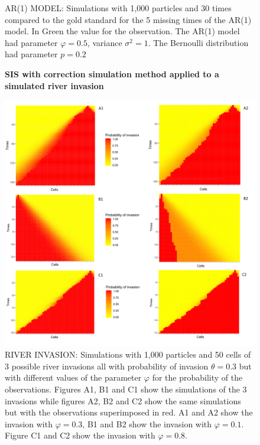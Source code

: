 \documentclass[11pt,a4paper]{article}
\begin{document}
\begin{figure} [h!]
    \caption{AR(1) MODEL: Simulations with 1,000 particles and 30 times compared to the gold standard for the 5 missing times of the AR(1) model. In Green the value for the observation. The AR(1) model had parameter $\varphi = 0.5$, variance $\sigma^2 = 1$. The Bernoulli distribution had parameter $p = 0.2$}
\label{fig:1}
\end{figure}

\begin{figure} [h!]
    \textbf{SIS with correction simulation method applied to a simulated river invasion }\par\medskip
    \includegraphics[width=\textwidth]{Thesis/river_007.png}
    \caption{RIVER INVASION: Simulations with 1,000 particles and 50 cells of 3 possible river invasions all with probability of invasion $\theta = 0.3$ but with different values of the parameter $\varphi$ for the probability of the observations. Figures A1, B1 and C1 show the simulations of the 3 invasions while figures A2, B2 and C2 show the same simulations but with the observations superimposed in red. A1 and A2 show the invasion with $\varphi = 0.3$, B1 and B2 show the invasion with $\varphi = 0.1$. Figure C1 and C2 show the invasion with $\varphi = 0.8$.}
    \label{fig:2}
\end{figure}
\end{document}
